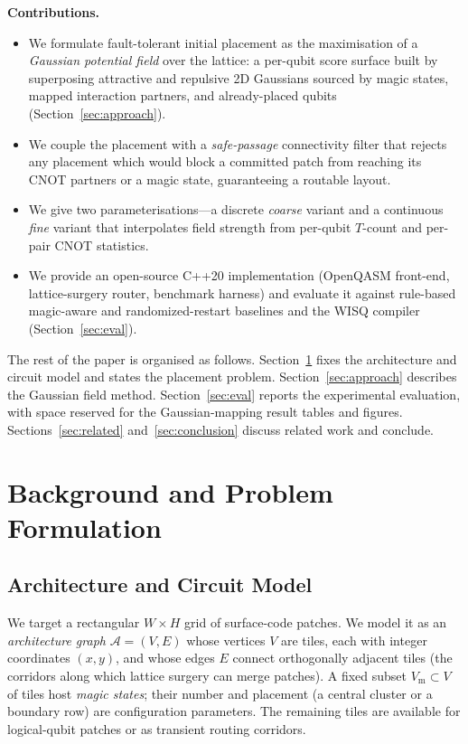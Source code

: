 \documentclass[10pt,conference]{IEEEtran}
\theoremstyle{definition}
\theoremstyle{remark}
\newcommand{\A}{\mathcal{A}}            %
\begin{document}
\smallskip
\noindent\textbf{Contributions.}
\begin{itemize}
    \item We formulate fault-tolerant initial placement as the maximisation of
    a \emph{Gaussian potential field} over the lattice: a per-qubit score
    surface built by superposing attractive and repulsive 2D Gaussians sourced
    by magic states, mapped interaction partners, and already-placed qubits
    (Section~\ref{sec:approach}).
    \item We couple the placement with a \emph{safe-passage} connectivity
    filter that rejects any placement which would block a committed patch from
    reaching its CNOT partners or a magic state, guaranteeing a routable layout.
    \item We give two parameterisations---a discrete \emph{coarse} variant and a
    continuous \emph{fine} variant that interpolates field strength from
    per-qubit $T$-count and per-pair CNOT statistics.
    \item We provide an open-source C++20 implementation (OpenQASM
    front-end, lattice-surgery router, benchmark harness) and evaluate it
    against rule-based magic-aware and randomized-restart baselines and the
    WISQ compiler (Section~\ref{sec:eval}).
\end{itemize}

The rest of the paper is organised as follows.
Section~\ref{sec:background} fixes the architecture and circuit model and
states the placement problem. Section~\ref{sec:approach} describes the Gaussian
field method. Section~\ref{sec:eval} reports the experimental evaluation, with
space reserved for the Gaussian-mapping result tables and figures.
Sections~\ref{sec:related} and~\ref{sec:conclusion} discuss related work and
conclude.

\section{Background and Problem Formulation}
\label{sec:background}

\subsection{Architecture and Circuit Model}

We target a rectangular $W\times H$ grid of surface-code patches. We model it as
an \emph{architecture graph} $\A = (V, E)$ whose vertices $V$ are tiles, each
with integer coordinates $(x,y)$, and whose edges $E$ connect orthogonally
adjacent tiles (the corridors along which lattice surgery can merge patches). A
fixed subset $V_{\mathrm{m}} \subset V$ of tiles host \emph{magic states};
their number and placement (a central cluster or a boundary row) are
configuration parameters. The remaining tiles are available for logical-qubit
patches or as transient routing corridors.
\end{document}

